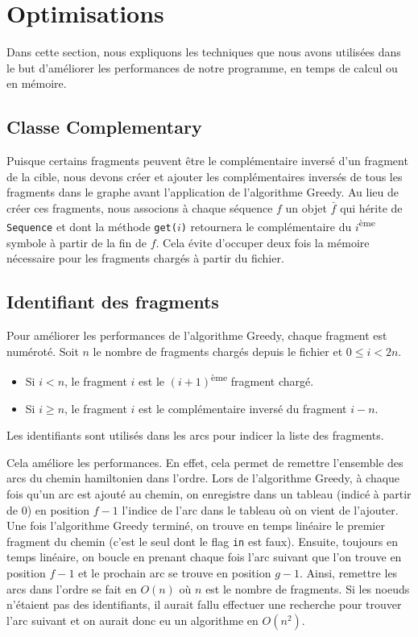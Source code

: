 \section{Optimisations}
Dans cette section, nous expliquons les techniques que nous avons utilisées dans le but d'améliorer les performances de notre programme, en temps de calcul ou en mémoire.

\subsection{Classe Complementary}
Puisque certains fragments peuvent être le complémentaire inversé d'un fragment
de la cible, nous devons créer et ajouter les complémentaires inversés de
tous les fragments dans le graphe avant l'application de l'algorithme Greedy.
Au lieu de créer ces fragments, nous associons à chaque séquence $f$ un objet
$\bar{f}$ qui hérite de \texttt{Sequence} et dont la méthode \texttt{get($i$)}
retournera le complémentaire du $i$\textsuperscript{ème} symbole
à partir de la fin de $f$.
Cela évite d'occuper deux fois la mémoire nécessaire
pour les fragments chargés à partir du fichier.

\subsection{Identifiant des fragments}\label{sec:id}
Pour améliorer les performances de l'algorithme Greedy, chaque fragment est
numéroté. Soit $n$ le nombre de fragments chargés depuis le fichier et $0 \le i < 2n$.
\begin{itemize}
 \item Si $i < n$, le fragment $i$ est le $(i+1)$\textsuperscript{ème} fragment chargé.
 \item Si $i \ge n$, le fragment $i$ est le complémentaire inversé du fragment $i-n$.
\end{itemize}

Les identifiants sont utilisés dans les arcs pour indicer la liste des fragments.

Cela améliore les performances. En effet, cela permet de remettre l'ensemble
des arcs du chemin hamiltonien dans l'ordre.
Lors de l'algorithme Greedy, à chaque fois qu'un arc  est ajouté
au chemin, on enregistre dans un tableau (indicé à partir de 0)
en position $f-1$ l'indice de l'arc dans le tableau où on vient de l'ajouter.
Une fois l'algorithme Greedy terminé, on trouve en temps linéaire
le premier fragment du chemin (c'est le seul dont le flag \texttt{in} est faux).
Ensuite, toujours en temps linéaire, on boucle en prenant chaque fois
l'arc  suivant que l'on trouve en position $f-1$ et
le prochain arc se trouve en position $g-1$.
Ainsi, remettre les arcs dans l'ordre se fait en $O(n)$
où $n$ est le nombre de fragments.
Si les noeuds n'étaient pas des identifiants, il aurait fallu effectuer
une recherche pour trouver l'arc suivant et
on aurait donc eu un algorithme en $O\left(n^2\right)$.

